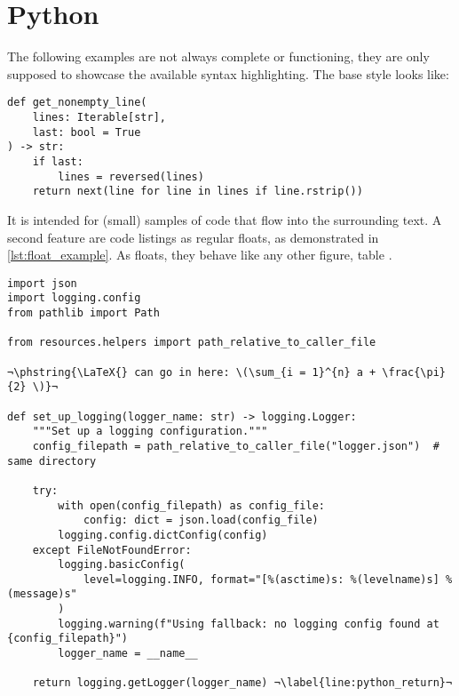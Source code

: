 \section{Python}
The following examples are not always complete or functioning, they are only supposed
to showcase the available syntax highlighting.
The base style looks like:
\begin{verbatim}
def get_nonempty_line(
    lines: Iterable[str],
    last: bool = True
) -> str:
    if last:
        lines = reversed(lines)
    return next(line for line in lines if line.rstrip())
\end{verbatim}
It is intended for (small) samples of code that flow into the surrounding text.
A second feature are code listings as regular floats, as demonstrated in
\cref{lst:float_example}.
As floats, they behave like any other figure, table .

\begin{listing}
    \begin{verbatim}
import json
import logging.config
from pathlib import Path

from resources.helpers import path_relative_to_caller_file

¬\phstring{\LaTeX{} can go in here: \(\sum_{i = 1}^{n} a + \frac{\pi}{2} \)}¬

def set_up_logging(logger_name: str) -> logging.Logger:
    """Set up a logging configuration."""
    config_filepath = path_relative_to_caller_file("logger.json")  # same directory

    try:
        with open(config_filepath) as config_file:
            config: dict = json.load(config_file)
        logging.config.dictConfig(config)
    except FileNotFoundError:
        logging.basicConfig(
            level=logging.INFO, format="[%(asctime)s: %(levelname)s] %(message)s"
        )
        logging.warning(f"Using fallback: no logging config found at {config_filepath}")
        logger_name = __name__

    return logging.getLogger(logger_name) ¬\label{line:python_return}¬
    \end{verbatim}
    \caption{%
        This is a caption.
        Listings cannot be overly long since floats do not page-break%
    }
    \label{lst:float_example}
\end{listing}

